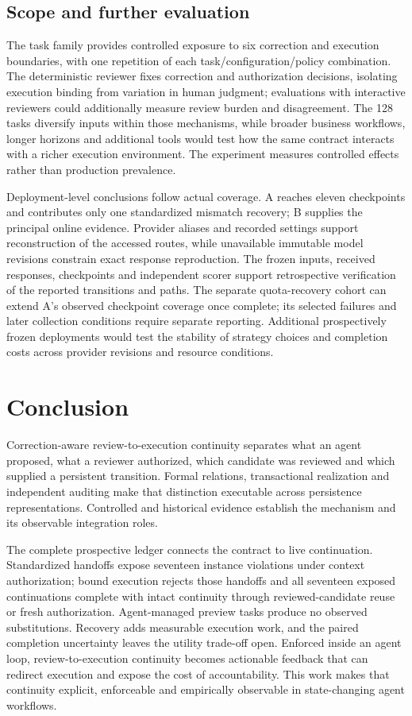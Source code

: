 \documentclass[10pt,a4paper,twocolumn]{article}
\begin{document}
\subsection{Scope and further evaluation}
The task family provides controlled exposure to six correction and execution boundaries, with one repetition of each task/configuration/policy combination. The deterministic reviewer fixes correction and authorization decisions, isolating execution binding from variation in human judgment; evaluations with interactive reviewers could additionally measure review burden and disagreement. The 128 tasks diversify inputs within those mechanisms, while broader business workflows, longer horizons and additional tools would test how the same contract interacts with a richer execution environment. The experiment measures controlled effects rather than production prevalence.

Deployment-level conclusions follow actual coverage. A reaches eleven checkpoints and contributes only one standardized mismatch recovery; B supplies the principal online evidence. Provider aliases and recorded settings support reconstruction of the accessed routes, while unavailable immutable model revisions constrain exact response reproduction. The frozen inputs, received responses, checkpoints and independent scorer support retrospective verification of the reported transitions and paths. The separate quota-recovery cohort can extend A's observed checkpoint coverage once complete; its selected failures and later collection conditions require separate reporting. Additional prospectively frozen deployments would test the stability of strategy choices and completion costs across provider revisions and resource conditions.

\section{Conclusion}
Correction-aware review-to-execution continuity separates what an agent proposed, what a reviewer authorized, which candidate was reviewed and which supplied a persistent transition. Formal relations, transactional realization and independent auditing make that distinction executable across persistence representations. Controlled and historical evidence establish the mechanism and its observable integration roles.

The complete prospective ledger connects the contract to live continuation. Standardized handoffs expose seventeen instance violations under context authorization; bound execution rejects those handoffs and all seventeen exposed continuations complete with intact continuity through reviewed-candidate reuse or fresh authorization. Agent-managed preview tasks produce no observed substitutions. Recovery adds measurable execution work, and the paired completion uncertainty leaves the utility trade-off open. Enforced inside an agent loop, review-to-execution continuity becomes actionable feedback that can redirect execution and expose the cost of accountability. This work makes that continuity explicit, enforceable and empirically observable in state-changing agent workflows.
\end{document}
